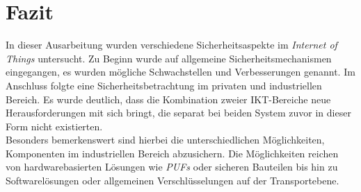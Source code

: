 \documentclass[conference]{IEEEtran}
\begin{document}
%





\section{Fazit}

In dieser Ausarbeitung wurden verschiedene Sicherheitsaspekte im \textit{Internet of Things} untersucht. Zu Beginn wurde auf allgemeine Sicherheitsmechanismen eingegangen, es wurden mögliche Schwachstellen und Verbesserungen genannt. Im Anschluss folgte eine Sicherheitsbetrachtung im privaten und industriellen Bereich. Es wurde deutlich, dass die Kombination zweier IKT-Bereiche neue Herausforderungen mit sich bringt, die separat bei beiden System zuvor in dieser Form nicht existierten.\\
Besonders bemerkenswert sind hierbei die unterschiedlichen Möglichkeiten, Komponenten im industriellen Bereich abzusichern. Die Möglichkeiten reichen von hardwarebasierten Lösungen wie \textit{PUFs} oder sicheren Bauteilen bis hin zu Softwarelösungen oder allgemeinen Verschlüsselungen auf der Transportebene. 
\end{document}
